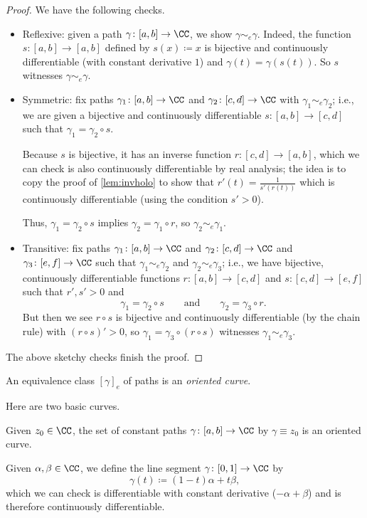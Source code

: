 \documentclass[../notes.tex]{subfiles}
\begin{document}
\begin{proof}
	We have the following checks.
	\begin{itemize}
		\item Reflexive: given a path $\gamma\colon [a,b]\to\CC$, we show $\gamma\sim_e\gamma$. Indeed, the function $s\colon [a,b]\to[a,b]$ defined by $s(x)\coloneqq x$ is bijective and continuously differentiable (with constant derivative $1$) and $\gamma(t)=\gamma(s(t))$. So $s$ witnesses $\gamma\sim_e\gamma$.
		\item Symmetric: fix paths $\gamma_1\colon [a,b]\to\CC$ and $\gamma_2\colon [c,d]\to\CC$ with $\gamma_1\sim_e\gamma_2$; i.e., we are given a bijective and continuously differentiable $s\colon [a,b]\to[c,d]$ such that $\gamma_1=\gamma_2\circ s$.

		Because $s$ is bijective, it has an inverse function $r\colon [c,d]\to[a,b]$, which we can check is also continuously differentiable by real analysis; the idea is to copy the proof of \autoref{lem:invholo} to show that $r'(t)=\frac1{s'(r(t))}$ which is continuously differentiable (using the condition $s'>0$).

		Thus, $\gamma_1=\gamma_2\circ s$ implies $\gamma_2=\gamma_1\circ r$, so $\gamma_2\sim_e\gamma_1$.

		\item Transitive: fix paths $\gamma_1\colon [a,b]\to\CC$ and $\gamma_2\colon [c,d]\to\CC$ and $\gamma_3\colon [e,f]\to\CC$ such that $\gamma_1\sim_e\gamma_2$ and $\gamma_2\sim_e\gamma_3$; i.e., we have bijective, continuously differentiable functions $r\colon [a,b]\to[c,d]$ and $s\colon [c,d]\to[e,f]$ such that $r',s'>0$ and
		\[\gamma_1=\gamma_2\circ s\qquad\text{and}\qquad\gamma_2=\gamma_3\circ r.\]
		But then we see $r\circ s$ is bijective and continuously differentiable (by the chain rule) with $(r\circ s)'>0$, so $\gamma_1=\gamma_3\circ(r\circ s)$ witnesses $\gamma_1\sim_e\gamma_3$.
	\end{itemize}
	The above sketchy checks finish the proof.
\end{proof}
\begin{definition}
	An equivalence class $[\gamma]_e$ of paths is an \textit{oriented curve}.
\end{definition}
Here are two basic curves.
\begin{example}
	Given $z_0\in\CC$, the set of constant paths $\gamma\colon [a,b]\to\CC$ by $\gamma\equiv z_0$ is an oriented curve.
\end{example}
\begin{example}
	Given $\alpha,\beta\in\CC$, we define the line segment $\gamma\colon [0,1]\to\CC$ by
	\[\gamma(t)\coloneqq (1-t)\alpha+t\beta,\]
	which we can check is differentiable with constant derivative ($-\alpha+\beta$) and is therefore continuously differentiable.
\end{example}
\end{document}

